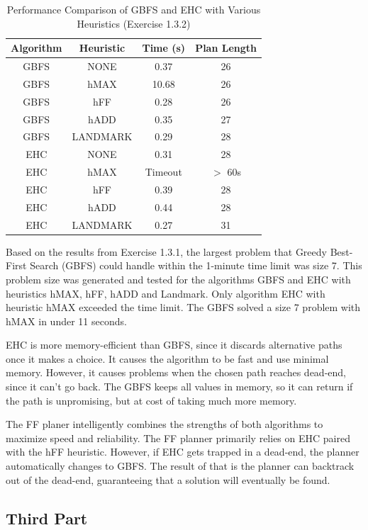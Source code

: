 \documentclass{article}
\begin{document}
\begin{table}[H]
\centering
\begin{tabular}{|c|c|c|c|}
\hline
\textbf{Algorithm} & \textbf{Heuristic} & \textbf{Time (s)} & \textbf{Plan Length} \\ \hline
GBFS & NONE & 0.37 & 26\\ \hline
GBFS & hMAX & 10.68 & 26 \\ \hline
GBFS & hFF & 0.28 & 26 \\ \hline
GBFS & hADD & 0.35 & 27 \\ \hline
GBFS & LANDMARK & 0.29 & 28 \\ \hline
EHC & NONE & 0.31 & 28 \\ \hline
EHC & hMAX & Timeout & $>$ 60s \\ \hline
EHC & hFF & 0.39 & 28 \\ \hline
EHC & hADD & 0.44 & 28 \\ \hline
EHC & LANDMARK & 0.27 & 31 \\ \hline
\end{tabular}
\caption{Performance Comparison of GBFS and EHC with Various Heuristics (Exercise 1.3.2)}
\label{tab:results_1_3_2}
\end{table}
Based on the results from Exercise 1.3.1, the largest problem that Greedy Best-First Search (GBFS) could handle within the 1-minute time limit was size 7. This problem size was generated and tested for the algorithms GBFS and EHC with heuristics hMAX, hFF, hADD and Landmark. Only algorithm EHC with heuristic hMAX exceeded the time limit. The GBFS solved a size 7 problem with hMAX in under 11 seconds.

EHC is more memory-efficient than GBFS, since it discards alternative paths once it makes a choice. It causes the algorithm to be fast and use minimal memory. However, it causes problems when the chosen path reaches dead-end, since it can't go back. The GBFS keeps all values in memory, so it can return if the path is unpromising, but at cost of taking much more memory. 

The FF planer intelligently combines the strengths of both algorithms to maximize speed and reliability.
The FF planner primarily relies on EHC paired with the hFF heuristic. However, if EHC gets trapped in a dead-end, the planner automatically changes to GBFS. The result of that is the planner can backtrack out of the dead-end, guaranteeing that a solution will eventually be found.


\subsection{Third Part}
\end{document}

